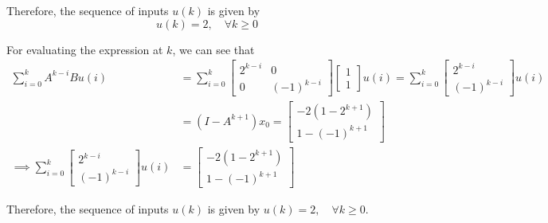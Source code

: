 Therefore, the sequence of inputs \( u(k) \) is given by
\[
    \boxed{
        u(k) = 2, \quad \forall k \geq 0
    }
\]

For evaluating the expression at \( k \), we can see that
\begin{align*}
    \sum_{i=0}^{k} A^{k - i} B u(i)
     & =
    \sum_{i=0}^{k}
    \left[\begin{array}{cc}
                  2^{k - i} & 0            \\
                  0         & (-1)^{k - i}
              \end{array}\right]
    \left[\begin{array}{c}
                  1 \\
                  1
              \end{array}\right]
    u(i)
    =
    \sum_{i=0}^{k}
    \left[\begin{array}{c}
                  2^{k - i} \\
                  (-1)^{k - i}
              \end{array}\right]
    u(i)
    \\ & =
    (I - A^{k + 1}) x_0
    =
    \left[\begin{array}{c}
                  -2(1 - 2^{k + 1}) \\
                  1 - (-1)^{k + 1}
              \end{array}\right]
    \\
    \implies
    \sum_{i=0}^{k}
    \left[\begin{array}{c}
                  2^{k - i} \\
                  (-1)^{k - i}
              \end{array}\right]
    u(i)
     & =
    \left[\begin{array}{c}
                  -2(1 - 2^{k + 1}) \\
                  1 - (-1)^{k + 1}
              \end{array}\right]
\end{align*}

Therefore, the sequence of inputs \( u(k) \) is given by \( u(k) = 2, \quad \forall k \geq 0 \).

